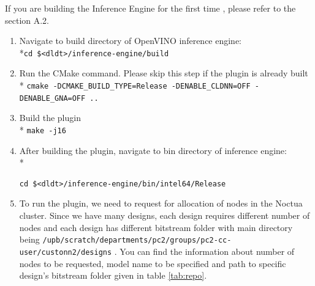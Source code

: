 If you are building the Inference Engine for the first time , please refer to the section A.2. 
\begin{enumerate}
\item Navigate to build directory of OpenVINO inference engine: \\*\texttt{cd \$<dldt>/inference-engine/build}
\item Run the CMake command. Please skip this step if the plugin is already built \\* \texttt{cmake -DCMAKE\_BUILD\_TYPE=Release -DENABLE\_CLDNN=OFF -DENABLE\_GNA=OFF ..}
\item Build the plugin \\* \texttt{make -j16}
\item After building the plugin, navigate to bin directory of inference engine: \\* \raggedright\texttt{cd \$<dldt>/inference-engine/bin/intel64/Release}
\item To run the plugin, we need to request for allocation of nodes in the Noctua cluster. Since we have many designs, each design requires different number of nodes and each design has different bitstream folder with main directory being \texttt{/upb/scratch/departments/pc2/groups/pc2-cc-user/custonn2/designs} . You can find the information about number of nodes to be requested, model name to be specified and path to specific design's bitstream folder given in table \ref{tab:repo}.


\end{enumerate}

